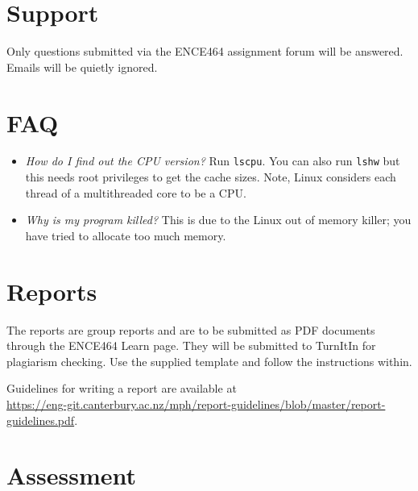 \documentclass[a4paper,11pt]{article}
\newcommand{\code}[1]{\texttt{#1}}
\begin{document}
\section{Support}

Only questions submitted via the ENCE464 assignment forum will be
answered.  Emails will be quietly ignored.


\section{FAQ}

\begin{itemize}
\item \emph{How do I find out the CPU version?}  Run \code{lscpu}.
  You can also run \code{lshw} but this needs root privileges to get
  the cache sizes.  Note, Linux considers each thread of a
  multithreaded core to be a CPU.

\item \emph{Why is my program killed?}  This is due to the Linux out
  of memory killer; you have tried to allocate too much memory.

\end{itemize}



\section{Reports}

The reports are group reports and are to be submitted as PDF documents
through the ENCE464 Learn page.  They will be submitted to TurnItIn
for plagiarism checking.  Use the supplied template and follow the
instructions within.

Guidelines for writing a report are available at\\
\url{https://eng-git.canterbury.ac.nz/mph/report-guidelines/blob/master/report-guidelines.pdf}.


\section{Assessment}
\end{document}
